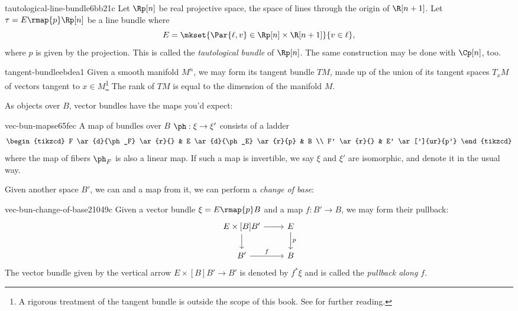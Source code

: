 \begin{exmp}{tautological-line-bundle}{6bb21c}
  Let $\Rp[n]$ be real projective space, the space of lines through the origin of
  $\R[n+1]$. Let $\tau = E \rmap{p} \Rp[n]$ be a line bundle where
  \[ E = \mkset{ \Par{\ell, v} \in \Rp[n] \times \R[n+1] }{ v \in \ell }, \] 
  where $p$ is given by the projection. This is called the \emph{tautological bundle} of
  $\Rp[n]$. The same construction may be done with $\Cp[n]$, too.
\end{exmp}

\begin{exmp}{tangent-bundle}{ebdea1}
  Given a smooth manifold $M^n$, we may form its tangent bundle $TM$, made up of the union of
  its tangent spaces $T_x M$ of vectors tangent to $x \in M$\footnote{A rigorous treatment of
  the tangent bundle is outside the scope of this book. See \citeme for further reading.}
  The rank of $TM$ is equal to the dimension of the manifold $M$.
\end{exmp}

As objects over $B$, vector bundles have the maps you'd expect:

\begin{defn}{vec-bun-maps}{e65fec}
  A map of bundles over $B$ $\ph: \xi \to \xi'$ consists of a ladder
  \[\begin{tikzcd}
    F \ar{d}{\ph_F} \ar{r}{} & E \ar{d}{\ph_E} \ar{r}{p} & B \\
    F' \ar{r}{} & E' \ar[']{ur}{p'}
  \end{tikzcd}\]
  where the map of fibers $\ph_F$ is also a linear map. If such a map
  is invertible, we say $\xi$ and $\xi'$ are isomorphic, and denote it
  in the usual way.
\end{defn}

Given another space $B'$, we can and a map from it, we can perform a
\emph{change of base}:
\begin{defn}{vec-bun-change-of-base}{21049c}
  Given a vector bundle $\xi = E \rmap{p} B$ and a map $f: B' \to B$, we may
  form their pullback:
  \[\begin{tikzcd}
    E \times[B] B' \ar{r}{} \ar{d}{} & \ar{d}{p} E \\
    B' \ar{r}{f} & B
  \end{tikzcd}\]
  The vector bundle given by the vertical arrow $E \times[B] B' \to B'$ is denoted
  by $f^*\xi$ and is called the \emph{pullback along $f$}.
\end{defn}

